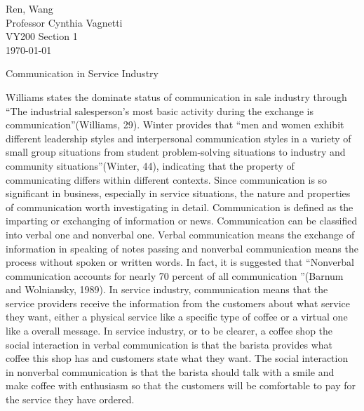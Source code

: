 \documentclass[12pt]{article}
\begin{document}
\begin{flushleft}

Ren, Wang\\
Professor Cynthia Vagnetti \\
VY200 Section 1\\
\today\\


\begin{center}
  Communication in Service Industry
\end{center}


\setlength{\parindent}{0.5in}


Williams states the dominate status of communication in sale industry through
``The industrial salesperson's most basic activity during the exchange is
communication''(Williams, 29). Winter provides that ``men and women exhibit
different leadership styles and interpersonal communication styles in a variety
of small group situations from student problem-solving situations to industry
and community situations''(Winter, 44), indicating that the property of communicating
differs within different contexts.
Since communication is so significant in business, especially in service
situations, the nature and properties of communication worth investigating in detail.
Communication is defined as the imparting or exchanging of information or news.
Communication can be classified into verbal one and nonverbal one. Verbal
communication means the exchange of information in speaking of notes passing and
nonverbal communication means the process without spoken or written words. In
fact, it is suggested that ``Nonverbal communication accounts for nearly 70 percent
of all communication ''(Barnum and Wolniansky, 1989).
In service industry, communication means that the service providers receive the
information from the customers about what service they want, either a physical
service like a specific type of coffee or a virtual one like a overall message.
In service industry, or to be clearer, a coffee shop the social interaction in
verbal communication is that the barista provides what coffee this shop has and
customers state what they want. The social interaction in nonverbal
communication is that the barista should talk with a smile and make
coffee with enthusiasm so that the customers will be comfortable to pay for the
service they have ordered.

\end{flushleft}
\end{document}
